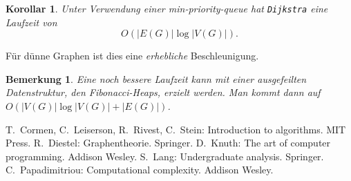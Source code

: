 \documentclass[10pt,reqno]{amsart}
\numberwithin{equation}{section}
\newtheorem{remark}[definition]{Bemerkung}
\newtheorem{corollary}[definition]{Korollar}
\begin{document}
\begin{corollary}\label{cor_dijkstra}
	Unter Verwendung einer min-priority-queue hat {\tt Dijkstra} eine Laufzeit von $$O(|E(G)|\log|V(G)|).$$
\end{corollary}

\noindent
F\"ur d\"unne Graphen ist dies eine {\em erhebliche} Beschleunigung.

\begin{remark}\label{rem_fibonacci}\upshape
Eine noch bessere Laufzeit kann mit einer ausgefeilten Datenstruktur, den {\em Fibonacci-Heaps}, erzielt werden.
Man kommt dann auf $O(|V(G)|\log|V(G)|+|E(G)|)$.
\end{remark}


\begin{thebibliography}{99}
	T.~Cormen, C.~Leiserson, R.~Rivest, C.~Stein: Introduction to algorithms. MIT Press.
	R.~Diestel: Graphentheorie. Springer.
	D.~Knuth: The art of computer programming. Addison Wesley.
	S.~Lang: Undergraduate analysis. Springer.
	C.~Papadimitriou: Computational complexity. Addison Wesley.
\end{thebibliography}
\end{document}
